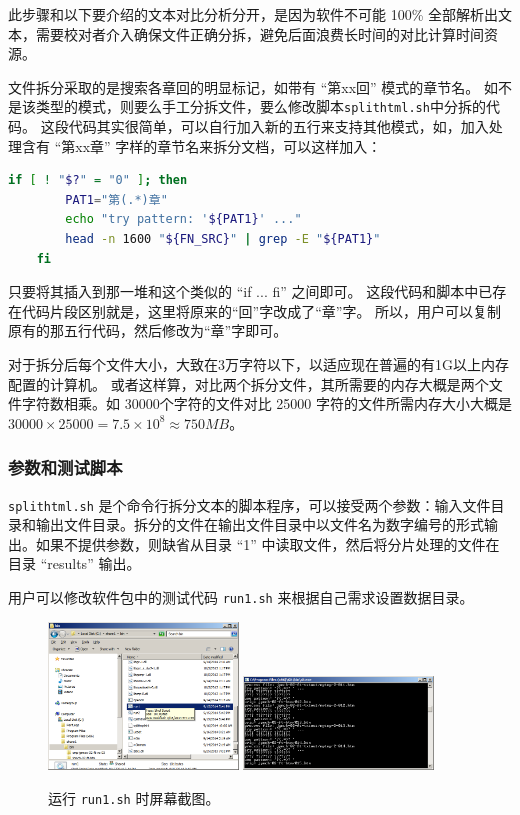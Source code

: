 \documentclass{article}
\begin{document}
此步骤和以下要介绍的文本对比分析分开，是因为软件不可能 100\% 全部解析出文本，需要校对者介入确保文件正确分拆，避免后面浪费长时间的对比计算时间资源。


文件拆分采取的是搜索各章回的明显标记，如带有 ``第xx回'' 模式的章节名。
如不是该类型的模式，则要么手工分拆文件，要么修改脚本\texttt{splithtml.sh}中分拆的代码。
这段代码其实很简单，可以自行加入新的五行来支持其他模式，如，加入处理含有 ``第xx章'' 字样的章节名来拆分文档，可以这样加入：
\begin{lstlisting}[language=bash]
    if [ ! "$?" = "0" ]; then
        PAT1="第(.*)章"
        echo "try pattern: '${PAT1}' ..."
        head -n 1600 "${FN_SRC}" | grep -E "${PAT1}"
    fi
\end{lstlisting}

只要将其插入到那一堆和这个类似的 ``if ... fi'' 之间即可。
这段代码和脚本中已存在代码片段区别就是，这里将原来的``回''字改成了``章''字。
所以，用户可以复制原有的那五行代码，然后修改为``章''字即可。

对于拆分后每个文件大小，大致在3万字符以下，以适应现在普遍的有1G以上内存配置的计算机。
或者这样算，对比两个拆分文件，其所需要的内存大概是两个文件字符数相乘。如 30000个字符的文件对比 25000 字符的文件所需内存大小大概是 $30000 \times 25000 = 7.5 \times 10 ^8 \approx 750 MB$。

\subsubsection{参数和测试脚本}

\texttt{splithtml.sh} 是个命令行拆分文本的脚本程序，可以接受两个参数：输入文件目录和输出文件目录。拆分的文件在输出文件目录中以文件名为数字编号的形式输出。如果不提供参数，则缺省从目录 ``1'' 中读取文件，然后将分片处理的文件在目录 ``results'' 输出。

用户可以修改软件包中的测试代码 \texttt{run1.sh} 来根据自己需求设置数据目录。


\begin{figure}[ht]\centering
  \includegraphics[width=0.45\textwidth]{figures/click-run1.png}
  \includegraphics[width=0.45\textwidth]{figures/run1-screen.png}
  \caption{运行 \texttt{run1.sh} 时屏幕截图。}\label{fig:run1screen}
\end{figure}
\end{document}
